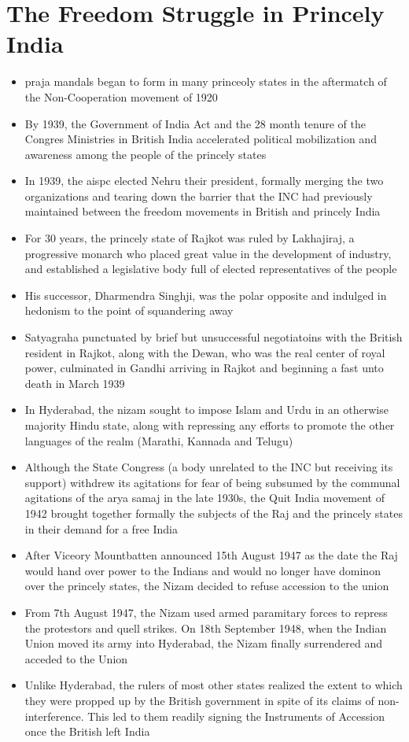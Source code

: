 \section{The Freedom Struggle in Princely India}
\begin{itemize}
    \item \Glspl{praja mandal} began to form in many princeoly states in the aftermatch of the Non-Cooperation movement of 1920
    \item By 1939, the Government of India Act and the 28 month tenure of the Congres Ministries in British India accelerated political mobilization and awareness among the people of the princely states
    \item In 1939, the \acrshort{aispc} elected Nehru their president, formally merging the two organizations and tearing down the barrier that the INC had previously maintained between the freedom movements in British and princely India
    \item For 30 years, the princely state of Rajkot was ruled by Lakhajiraj, a progressive monarch who placed great value in the development of industry, and established a legislative body full of elected representatives of the people
    \item His successor, Dharmendra Singhji, was the polar opposite and indulged in hedonism to the point of squandering away
    \item Satyagraha punctuated by brief but unsuccessful negotiatoins with the British resident in Rajkot, along with the Dewan, who was the real center of royal power, culminated in Gandhi arriving in Rajkot and beginning a fast unto death in March 1939
    \item In Hyderabad, the \Gls{nizam} sought to impose Islam and Urdu in an otherwise majority Hindu state, along with repressing any efforts to promote the other languages of the realm (Marathi, Kannada and Telugu)
    \item Although the State Congress (a body unrelated to the INC but receiving its support) withdrew its agitations for fear of being subsumed by the communal agitations of the \Gls{arya samaj} in the late 1930s, the Quit India movement of 1942 brought together formally the subjects of the Raj and the princely states in their demand for a free India
    \item After Viceory Mountbatten announced 15th August 1947 as the date the Raj would hand over power to the Indians and would no longer have dominon over the princely states, the Nizam decided to refuse accession to the union
    \item From 7th August 1947, the Nizam used armed paramitary forces to repress the protestors and quell strikes. On 18th September 1948, when the Indian Union moved its army into Hyderabad, the Nizam finally surrendered and acceded to the Union
    \item Unlike Hyderabad, the rulers of most other states realized the extent to which they were propped up by the British government in spite of its claims of non-interference. This led to them readily signing the Instruments of Accession once the British left India
\end{itemize}

